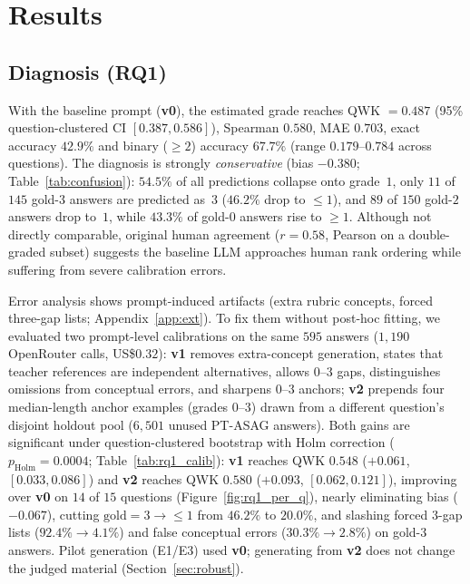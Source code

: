 \documentclass[11pt]{article}
\begin{document}
\section{Results}

\subsection{Diagnosis (RQ1)}
With the baseline prompt (\textbf{v0}), the estimated grade reaches QWK $=0.487$ (95\% question-clustered CI $[0.387, 0.586]$), Spearman $0.580$, MAE $0.703$, exact accuracy $42.9\%$ and binary ($\ge 2$) accuracy $67.7\%$ (range $0.179$--$0.784$ across questions). The diagnosis is strongly \emph{conservative} (bias $-0.380$; Table~\ref{tab:confusion}): $54.5\%$ of all predictions collapse onto grade~$1$, only $11$ of $145$ gold-$3$ answers are predicted as~$3$ ($46.2\%$ drop to $\le 1$), and $89$ of $150$ gold-$2$ answers drop to~$1$, while $43.3\%$ of gold-$0$ answers rise to $\ge 1$. Although not directly comparable, original human agreement ($r{=}0.58$, Pearson on a double-graded subset) suggests the baseline LLM approaches human rank ordering while suffering from severe calibration errors.

Error analysis shows prompt-induced artifacts (extra rubric concepts, forced three-gap lists; Appendix~\ref{app:ext}). To fix them without post-hoc fitting, we evaluated two prompt-level calibrations on the same $595$ answers ($1{,}190$ OpenRouter calls, US\$$0.32$): \textbf{v1} removes extra-concept generation, states that teacher references are independent alternatives, allows $0$--$3$ gaps, distinguishes omissions from conceptual errors, and sharpens $0$--$3$ anchors; \textbf{v2} prepends four median-length anchor examples (grades $0$--$3$) drawn from a different question's disjoint holdout pool ($6{,}501$ unused PT-ASAG answers). Both gains are significant under question-clustered bootstrap with Holm correction ($p_{\text{Holm}}{=}0.0004$; Table~\ref{tab:rq1_calib}): \textbf{v1} reaches QWK $0.548$ ($+0.061$, $[0.033, 0.086]$) and \textbf{v2} reaches QWK $0.580$ ($+0.093$, $[0.062, 0.121]$), improving over \textbf{v0} on $14$ of $15$ questions (Figure~\ref{fig:rq1_per_q}), nearly eliminating bias ($-0.067$), cutting $\text{gold}{=}3 \to \le 1$ from $46.2\%$ to $20.0\%$, and slashing forced $3$-gap lists ($92.4\% \to 4.1\%$) and false conceptual errors ($30.3\% \to 2.8\%$) on gold-$3$ answers. Pilot generation (E1/E3) used \textbf{v0}; generating from \textbf{v2} does not change the judged material (Section~\ref{sec:robust}).
\end{document}
